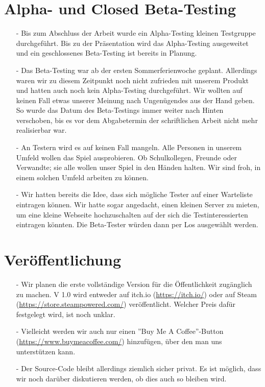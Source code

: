\section{Alpha- und Closed Beta-Testing}
\begin{itemize}
    \item[-] Bis zum Abschluss der Arbeit wurde ein Alpha-Testing kleinen Testgruppe durchgeführt. Bis zu der Präsentation wird
    das Alpha-Testing ausgeweitet und ein geschlossenes Beta-Testing ist bereits in Planung. 
    \item[-] Das Beta-Testing war ab der ersten Sommerferienwoche geplant. Allerdings waren wir zu diesem Zeitpunkt noch nicht zufrieden mit unserem Produkt und hatten auch noch kein Alpha-Testing durchgeführt. Wir wollten
    auf keinen Fall etwas unserer Meinung nach Ungenügendes aus der Hand geben. So wurde das Datum des Beta-Testings immer weiter nach Hinten verschoben, bis es vor dem Abgabetermin der schriftlichen Arbeit nicht mehr realisierbar war.
    \item[-] An Testern wird es auf keinen Fall mangeln. Alle Personen in unserem Umfeld wollen
    das Spiel ausprobieren. Ob Schulkollegen, Freunde oder Verwandte; sie alle wollen unser Spiel in den Händen halten. Wir sind froh, in einem solchen Umfeld arbeiten zu können.
    \item[-] Wir hatten bereits die Idee, dass sich mögliche Tester auf einer Warteliste eintragen können. Wir hatte sogar angedacht, einen kleinen Server zu mieten,
    um eine kleine Webseite hochzuschalten auf der sich die Testinteressierten eintragen könnten. Die Beta-Tester würden dann per Los ausgewählt werden.
\end{itemize}

\section{Veröffentlichung}
\begin{itemize}
    \item[-] Wir planen die erste vollständige Version für die Öffentlichkeit zugänglich zu machen. V 1.0 wird entweder auf itch.io (\url{https://itch.io/}) oder auf Steam 
    (\url{https://store.steampowered.com/}) veröffentlicht. Welcher Preis dafür festgelegt wird, ist noch unklar.
    \item[-] Vielleicht werden wir auch nur einen ''Buy Me A Coffee''-Button (\url{https://www.buymeacoffee.com/}) hinzufügen, über den man uns unterstützen kann. 
    \item[-] Der Source-Code bleibt allerdings ziemlich sicher privat. Es ist möglich, dass wir noch darüber diskutieren werden, ob dies auch so bleiben wird.
\end{itemize}




